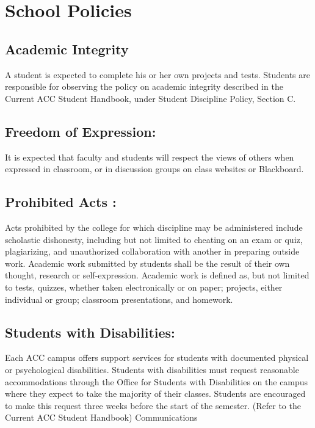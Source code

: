 \documentclass[a4paper]{article}
\begin{document}
\section{School Policies%
  \label{school-policies}%
}


\subsection{Academic Integrity%
  \label{academic-integrity}%
}

A student is expected to complete his or her own projects and tests. Students
are responsible for observing the policy on academic integrity described in
the Current ACC Student Handbook, under \textquotedbl{}Student Discipline Policy, Section
C\textquotedbl{}.


\subsection{Freedom of Expression:%
  \label{freedom-of-expression}%
}

It is expected that faculty and students will respect the views of others when
expressed in classroom, or in discussion groups on class websites or
Blackboard.


\subsection{Prohibited Acts :%
  \label{prohibited-acts}%
}

Acts prohibited by the college for which discipline may be administered
include scholastic dishonesty, including but not limited to cheating on an
exam or quiz, plagiarizing, and unauthorized collaboration with another in
preparing outside work. Academic work submitted by students shall be the
result of their own thought, research or self-expression. Academic work is
defined as, but not limited to tests, quizzes, whether taken electronically or
on paper; projects, either individual or group; classroom presentations, and
homework.


\subsection{Students with Disabilities:%
  \label{students-with-disabilities}%
}

Each ACC campus offers support services for students with documented physical
or psychological disabilities. Students with disabilities must request
reasonable accommodations through the Office for Students with Disabilities on
the campus where they expect to take the majority of their classes. Students
are encouraged to make this request three weeks before the start of the
semester. (Refer to the Current ACC Student Handbook) \textquotedbl{}Communications\textquotedbl{}
\end{document}
